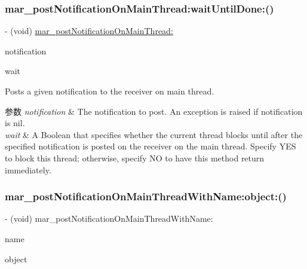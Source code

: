 \subsubsection{\texorpdfstring{mar\+\_\+post\+Notification\+On\+Main\+Thread\+:wait\+Until\+Done\+:()}{mar\_postNotificationOnMainThread:waitUntilDone:()}}
{\footnotesize\ttfamily -\/ (void) \hyperlink{category_n_s_notification_center_07_m_a_r_e_x_08_a8af99101dd876b5d2633c7741abee5c0}{mar\+\_\+post\+Notification\+On\+Main\+Thread\+:} \begin{DoxyParamCaption}\item[{(N\+S\+Notification $\ast$)}]{notification }\item[{waitUntilDone:(B\+O\+OL)}]{wait }\end{DoxyParamCaption}}

Posts a given notification to the receiver on main thread.


\begin{DoxyParams}{参数}
{\em notification} & The notification to post. An exception is raised if notification is nil.\\
\hline
{\em wait} & A Boolean that specifies whether the current thread blocks until after the specified notification is posted on the receiver on the main thread. Specify Y\+ES to block this thread; otherwise, specify NO to have this method return immediately. \\
\hline
\end{DoxyParams}
\mbox{\label{category_n_s_notification_center_07_m_a_r_e_x_08_a17fca122dcc906b60d18f9eebaf63484}} 
\subsubsection{\texorpdfstring{mar\+\_\+post\+Notification\+On\+Main\+Thread\+With\+Name\+:object\+:()}{mar\_postNotificationOnMainThreadWithName:object:()}\hspace{0.1cm}{\footnotesize\ttfamily [1/2]}}
{\footnotesize\ttfamily -\/ (void) mar\+\_\+post\+Notification\+On\+Main\+Thread\+With\+Name\+: \begin{DoxyParamCaption}\item[{(N\+S\+String $\ast$)}]{name }\item[{object:(nullable id)}]{object }\end{DoxyParamCaption}}

